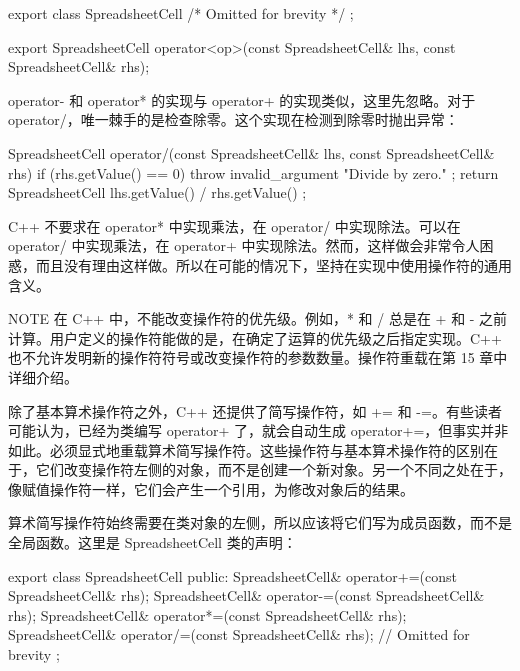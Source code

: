 \begin{cpp}
export class SpreadsheetCell { /* Omitted for brevity */ };

export SpreadsheetCell operator<op>(const SpreadsheetCell& lhs,
    const SpreadsheetCell& rhs);
\end{cpp}

operator- 和 operator* 的实现与 operator+ 的实现类似，这里先忽略。对于 operator/，唯一棘手的是检查除零。这个实现在检测到除零时抛出异常：

\begin{cpp}
SpreadsheetCell operator/(const SpreadsheetCell& lhs,
    const SpreadsheetCell& rhs)
{
    if (rhs.getValue() == 0) {
        throw invalid_argument { "Divide by zero." };
    }
    return SpreadsheetCell { lhs.getValue() / rhs.getValue() };
}
\end{cpp}

C++ 不要求在 operator* 中实现乘法，在 operator/ 中实现除法。可以在 operator/ 中实现乘法，在 operator+ 中实现除法。然而，这样做会非常令人困惑，而且没有理由这样做。所以在可能的情况下，坚持在实现中使用操作符的通用含义。

\begin{myNotic}{NOTE}
在 C++ 中，不能改变操作符的优先级。例如，* 和 / 总是在 + 和 - 之前计算。用户定义的操作符能做的是，在确定了运算的优先级之后指定实现。C++ 也不允许发明新的操作符符号或改变操作符的参数数量。操作符重载在第 15 章中详细介绍。
\end{myNotic}


除了基本算术操作符之外，C++ 还提供了简写操作符，如 += 和 -=。有些读者可能认为，已经为类编写 operator+ 了，就会自动生成 operator+=，但事实并非如此。必须显式地重载算术简写操作符。这些操作符与基本算术操作符的区别在于，它们改变操作符左侧的对象，而不是创建一个新对象。另一个不同之处在于，像赋值操作符一样，它们会产生一个引用，为修改对象后的结果。

算术简写操作符始终需要在类对象的左侧，所以应该将它们写为成员函数，而不是全局函数。这里是 SpreadsheetCell 类的声明：

\begin{cpp}
export class SpreadsheetCell
{
    public:
        SpreadsheetCell& operator+=(const SpreadsheetCell& rhs);
        SpreadsheetCell& operator-=(const SpreadsheetCell& rhs);
        SpreadsheetCell& operator*=(const SpreadsheetCell& rhs);
        SpreadsheetCell& operator/=(const SpreadsheetCell& rhs);
        // Omitted for brevity
};
\end{cpp}

